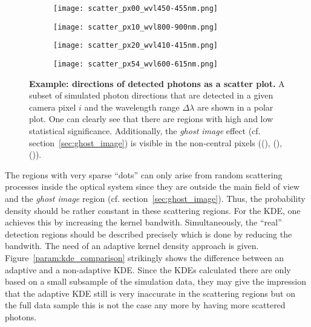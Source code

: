 \begin{figure}[H]
	\centering
	\begin{subfigure}[t]{0.49\textwidth}
		\texttt{[image: scatter\_px00\_wvl450-455nm.png]}
		\subcaption{}
		\label{param:example_scatter:1}
	\end{subfigure}
	\hfill
	\begin{subfigure}[t]{0.49\textwidth}
		\texttt{[image: scatter\_px10\_wvl800-900nm.png]}
		\subcaption{}
		\label{param:example_scatter:2}
	\end{subfigure}
	\vfill
	\begin{subfigure}[b]{0.49\textwidth}
		\texttt{[image: scatter\_px20\_wvl410-415nm.png]}
		\subcaption{}
		\label{param:example_scatter:3}
	\end{subfigure}
	\hfill
	\begin{subfigure}[b]{0.49\textwidth}
		\texttt{[image: scatter\_px54\_wvl600-615nm.png]}
		\subcaption{}
		\label{param:example_scatter:4}
	\end{subfigure}
	\caption[Example: directions of detected photons as a scatter plot]{\textbf{Example: directions of detected photons as a scatter plot.} A subset of simulated photon directions that are detected in a given camera pixel $i$ and the wavelength range $\Delta\lambda$ are shown in a polar plot. One can clearly see that there are regions with high and low statistical significance. Additionally, the \textit{ghost image} effect (cf. section~\ref{sec:ghost_image}) is visible in the non-central pixels ((), (), ()).}
	\label{param:example_scatter}	
\end{figure}

The regions with very sparse \enquote{dots} can only arise from random scattering processes inside the optical system since they are outside the main field of view and the \textit{ghost image} region (cf. section~\ref{sec:ghost_image}). Thus, the probability density should be rather constant in these scattering regions. For the KDE, one achieves this by increasing the kernel bandwith. Simultaneously, the \enquote{real} detection regions should be described precisely which is done by reducing the bandwith. The need of an adaptive kernel density approach is given. Figure~\ref{param:kde_comparison} strikingly shows the difference between an adaptive and a non-adaptive KDE. Since the KDEs calculated there are only based on a small subsample of the simulation data, they may give the impression that the adaptive KDE still is very inaccurate in the scattering regions but on the full data sample this is not the case any more by having more scattered photons.\\

